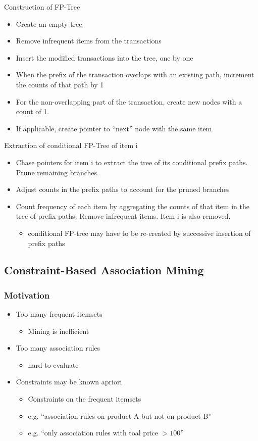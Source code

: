 \documentclass{article}
\begin{document}
Construction of FP-Tree
\begin{itemize}
  \item Create an empty tree
  \item Remove infrequent items from the transactions
  \item Insert the modified transactions into the tree, one by one
  \item When the prefix of the transaction overlaps with an existing path, increment the counts of that path by 1
  \item For the non-overlapping part of the transaction, create new nodes with a count of 1. 
  \item If applicable, create pointer to ``next'' node with the same item
\end{itemize}

Extraction of conditional FP-Tree of item i
\begin{itemize}
  \item Chase pointers for item i to extract the tree of its conditional prefix paths. Prune remaining branches.
  \item Adjust counts in the prefix paths to account for the pruned branches
  \item Count frequency of each item by aggregating the counts of that item in the tree of prefix paths. Remove infrequent items. Item i is also removed.
    \begin{itemize}
      \item conditional FP-tree may have to be re-created by successive insertion of prefix paths
    \end{itemize}  
\end{itemize}

\subsection{Constraint-Based Association Mining}
\subsubsection{Motivation}
\begin{itemize}
  \item Too many frequent itemsets
    \begin{itemize}
      \item Mining is inefficient
    \end{itemize}
  \item Too many association rules
    \begin{itemize}
      \item hard to evaluate
    \end{itemize}  
  \item Constraints may be known apriori
    \begin{itemize}
      \item Constraints on the frequent itemsets
      \item e.g. ``association rules on product A but not on product B''
      \item e.g. ``only association rules with toal price $ > 100$''
    \end{itemize}  
\end{itemize}
\end{document}
